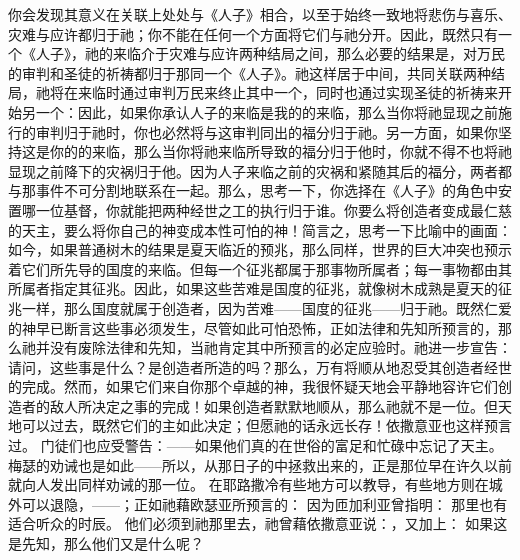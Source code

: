 你会发现其意义在关联上处处与《人子》相合，以至于始终一致地将悲伤与喜乐、灾难与应许都归于祂；你不能在任何一个方面将它们与祂分开。因此，既然只有一个《人子》，祂的来临介于灾难与应许两种结局之间，那么必要的结果是，对万民的审判和圣徒的祈祷都归于那同一个《人子》。祂这样居于中间，共同关联两种结局，祂将在来临时通过审判万民来终止其中一个，同时也通过实现圣徒的祈祷来开始另一个：因此，如果你承认人子的来临是我的的来临，那么当你将祂显现之前施行的审判归于祂时，你也必然将与这审判同出的福分归于祂。另一方面，如果你坚持这是你的的来临，那么当你将祂来临所导致的福分归于他时，你就不得不也将祂显现之前降下的灾祸归于他。因为人子来临之前的灾祸和紧随其后的福分，两者都与那事件不可分割地联系在一起。那么，思考一下，你选择在《人子》的角色中安置哪一位基督，你就能把两种经世之工的执行归于谁。你要么将创造者变成最仁慈的天主，要么将你自己的神变成本性可怕的神！简言之，思考一下比喻中的画面：  如今，如果普通树木的结果是夏天临近的预兆，那么同样，世界的巨大冲突也预示着它们所先导的国度的来临。但每一个征兆都属于那事物所属者；每一事物都由其所属者指定其征兆。因此，如果这些苦难是国度的征兆，就像树木成熟是夏天的征兆一样，那么国度就属于创造者，因为苦难——国度的征兆——归于祂。既然仁爱的神早已断言这些事必须发生，尽管如此可怕恐怖，正如法律和先知所预言的，那么祂并没有废除法律和先知，当祂肯定其中所预言的必定应验时。祂进一步宣告：  请问，这些事是什么？是创造者所造的吗？那么，万有将顺从地忍受其创造者经世的完成。然而，如果它们来自你那个卓越的神，我很怀疑天地会平静地容许它们创造者的敌人所决定之事的完成！如果创造者默默地顺从，那么祂就不是一位。但天地可以过去，既然它们的主如此决定；但愿祂的话永远长存！依撒意亚也这样预言过。 门徒们也应受警告：——如果他们真的在世俗的富足和忙碌中忘记了天主。梅瑟的劝诫也是如此——所以，从那日子的中拯救出来的，正是那位早在许久以前就向人发出同样劝诫的那一位。 在耶路撒冷有些地方可以教导，有些地方则在城外可以退隐，——；正如祂藉欧瑟亚所预言的：  因为匝加利亚曾指明：  那里也有适合听众的时辰。  他们必须到祂那里去，祂曾藉依撒意亚说：，又加上：  如果这是先知，那么他们又是什么呢？\par

